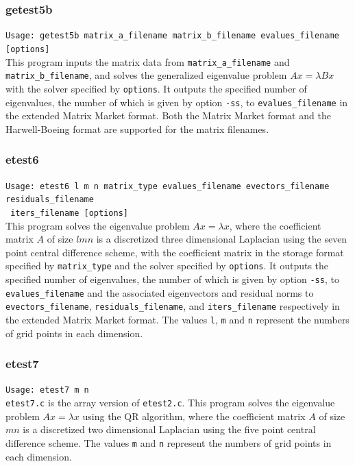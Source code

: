 \documentclass[a4paper]{article}
\begin{document}
\subsubsection{getest5b}

\verb+Usage: getest5b matrix_a_filename matrix_b_filename evalues_filename [options] +\\

This program inputs the matrix data from {\tt matrix\_a\_filename} and
{\tt matrix\_b\_filename}, and solves the generalized eigenvalue problem
$Ax=\lambda Bx$ with the solver specified by {\tt options}. 
It outputs the specified number of eigenvalues,
the number of which is given by option \verb|-ss|, to 
{\tt evalues\_filename} in the extended 
Matrix Market format.  
Both the Matrix Market format and the Harwell-Boeing format are
supported for the matrix filenames. 

\subsubsection{etest6}

\verb+Usage: etest6 l m n matrix_type evalues_filename evectors_filename residuals_filename +\\
\verb+ iters_filename [options] +\\

This program solves the eigenvalue problem $Ax = \lambda x$, where the 
coefficient matrix $A$ of size $lmn$ is a discretized three dimensional Laplacian using the seven
point central difference scheme, with the coefficient matrix in the storage format specified
by \verb|matrix_type| and the solver specified by {\tt options}. 
It outputs the specified number of eigenvalues,
the number of which is given by option \verb|-ss|, to 
{\tt evalues\_filename} and the associated 
eigenvectors and residual norms to {\tt evectors\_filename},  
{\tt residuals\_filename}, and {\tt iters\_filename} respectively 
in the extended Matrix Market format.
The values {\tt l}, {\tt m} and {\tt n} represent the numbers of grid
points in each dimension.

\subsubsection{etest7}

\verb+Usage: etest7 m n+\\

{\tt etest7.c} is the array version of {\tt etest2.c}.
This program solves the eigenvalue problem $Ax = \lambda x$ using
the QR algorithm, where the 
coefficient matrix $A$ of size $mn$ is a discretized two dimensional Laplacian using the five
point central difference scheme. 
The values {\tt m} and {\tt n} represent the numbers of grid points
in each dimension. 
\end{document}
